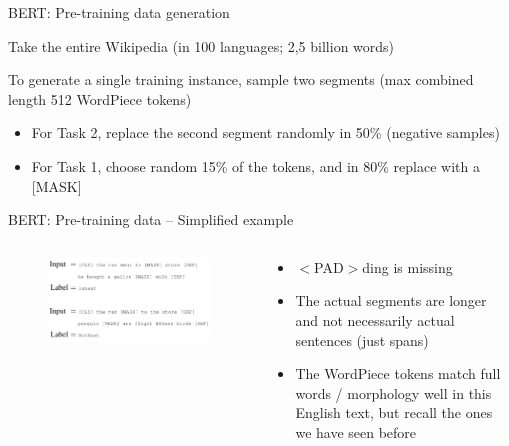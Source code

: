 \documentclass[12pt]{beamer}
\begin{document}
\begin{frame}{BERT: Pre-training data generation}

Take the entire Wikipedia (in 100 languages; 2,5 billion words)

To generate a single training instance, sample two segments (max combined length 512 WordPiece tokens)

\begin{itemize}
	\item For Task 2, replace the second segment randomly in 50\% (negative samples)
	\item For Task 1, choose random 15\% of the tokens, and in 80\% replace with a [MASK] 
\end{itemize}
	

\end{frame}


\begin{frame}{BERT: Pre-training data -- Simplified example}
	
\begin{columns}
	\begin{column}{0.5\linewidth}
		\begin{figure}
			\includegraphics[width=\linewidth]{img/bert-pretraining2.png}
		\end{figure}
	\end{column}
	\begin{column}{0.5\linewidth}
	\begin{small}

	\begin{itemize}
		\item $<$PAD$>$ding is missing
		\item The actual segments are longer and not necessarily actual sentences (just spans)
		\item The WordPiece tokens match full words / morphology well in this English text, but recall the ones we have seen before
	\end{itemize}
	\end{small}
	\end{column}
\end{columns}
	
	
\end{frame}
\end{document}
